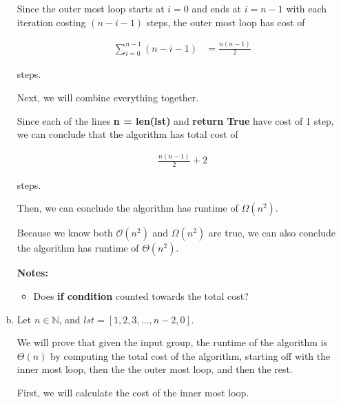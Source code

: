 \documentclass[12pt]{article}
\begin{document}
\begin{enumerate}[a.]
    Since the outer most loop starts at $i = 0$ and ends at $i = n-1$ with each iteration
    costing $(n - i -1)$ steps, the outer most loop has cost of

    \begin{align}
        \sum\limits_{i=0}^{n-1} (n-i-1) &= \frac{n(n-1)}{2}
    \end{align}

    steps.

    \bigskip

    Next, we will combine everything together.

    \bigskip

    Since each of the lines \textbf{n = len(lst)} and \textbf{return True} have
    cost of 1 step, we can conclude that the algorithm has total cost of

    \begin{align}
        \frac{n(n-1)}{2} + 2
    \end{align}

    steps.

    \bigskip

    Then, we can conclude the algorithm has runtime of $\Omega(n^2)$.

    \bigskip

    Because we know both $\mathcal{O}(n^2)$ and $\Omega(n^2)$ are true, we can
    also conclude the algorithm has runtime of $\Theta(n^2)$.

    \bigskip

    \textbf{Notes:}

    \begin{itemize}
        \item Does \textbf{if condition} counted towards the total cost?

    \end{itemize}

    \item

    Let $n \in \mathbb{N}$, and $lst = [1,2,3,\dots,n-2,0]$.

    \bigskip

    We will prove that given the input group, the runtime of the algorithm is
    $\Theta(n)$ by computing the total cost of the algorithm, starting off
    with the inner most loop, then the the outer most loop, and then the rest.

    \bigskip

    First, we will calculate the cost of the inner most loop.

    \bigskip


\end{enumerate}
\end{document}
